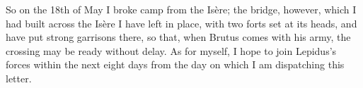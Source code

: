 So on the 18th of May I broke camp from the Is\`ere; the bridge, however, which I had built across the Is\`ere I have left in place, with two forts set at its heads, and have put strong garrisons there, so that, when Brutus comes with his army, the crossing may be ready without delay. As for myself, I hope to join Lepidus's forces within the next eight days from the day on which I am dispatching this letter.
